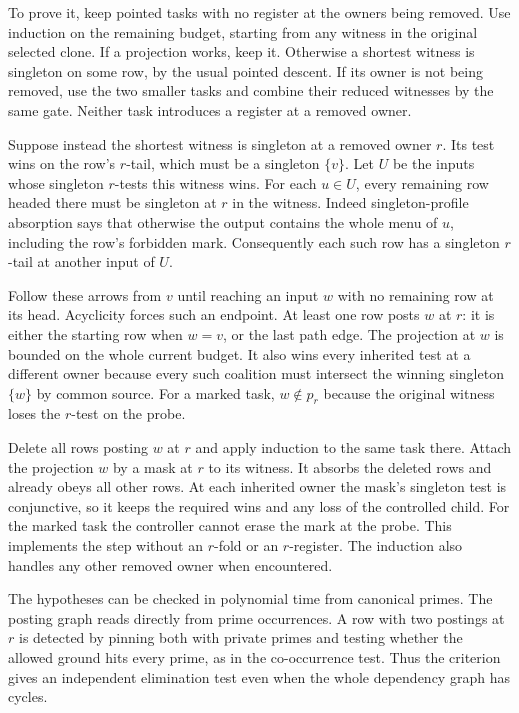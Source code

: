 To prove it, keep pointed tasks with no register at
the owners being removed. Use induction on the
remaining budget, starting from any witness in the
original selected clone. If a projection works, keep
it. Otherwise a shortest witness is singleton on
some row, by the usual pointed descent. If its owner
is not being removed, use the two smaller tasks and
combine their reduced witnesses by the same gate.
Neither task introduces a register at a removed
owner.

Suppose instead the shortest witness is singleton
at a removed owner $r$. Its test wins on the row's
$r$-tail, which must be a singleton $\{v\}$. Let
$U$ be the inputs whose singleton $r$-tests this
witness wins. For each $u\in U$, every remaining
row headed there must be singleton at $r$ in the
witness. Indeed singleton-profile absorption says
that otherwise the output contains the whole menu
of $u$, including the row's forbidden mark.
Consequently each such row has a singleton
$r$-tail at another input of $U$.

Follow these arrows from $v$ until reaching an
input $w$ with no remaining row at its head.
Acyclicity forces such an endpoint. At least
one row posts $w$ at $r$: it is either the
starting row when $w=v$, or the last path edge.
The projection at $w$ is bounded on the whole
current budget. It also wins every inherited
test at a different owner because every such
coalition must intersect the winning singleton
$\{w\}$ by common source. For a marked task,
$w\notin p_r$ because the original witness
loses the $r$-test on the probe.

Delete all rows posting $w$ at $r$ and apply
induction to the same task there. Attach the
projection $w$ by a mask at $r$ to its witness.
It absorbs the deleted rows and already obeys
all other rows. At each inherited owner the
mask's singleton test is conjunctive, so it
keeps the required wins and any loss of the
controlled child. For the marked task the
controller cannot erase the mark at the probe.
This implements the step without an $r$-fold
or an $r$-register. The induction also handles
any other removed owner when encountered.

The hypotheses can be checked in polynomial
time from canonical primes. The posting graph
reads directly from prime occurrences. A row
with two postings at $r$ is detected by pinning
both with private primes and testing whether
the allowed ground hits every prime, as in
the co-occurrence test. Thus the criterion
gives an independent elimination test even
when the whole dependency graph has cycles.

